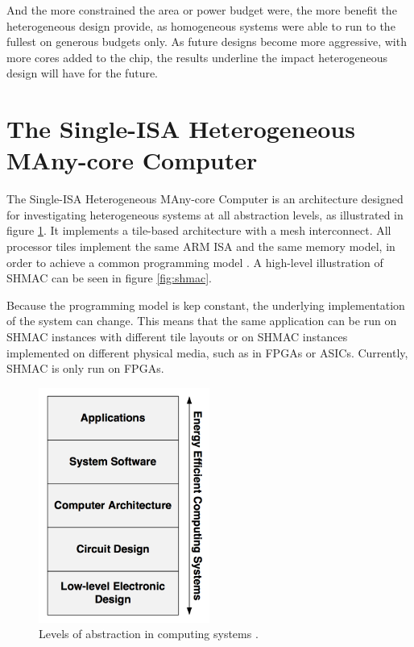 And the more constrained the area or power budget were, the more benefit the heterogeneous design provide, as homogeneous systems were able to run to the fullest on generous budgets only.
As future designs become more aggressive, with more cores added to the chip, the results underline the impact heterogeneous design will have for the future. 


\section{The Single-ISA Heterogeneous MAny-core Computer}
\label{sec:shmac}

The Single-ISA Heterogeneous MAny-core Computer is an architecture designed for investigating heterogeneous
systems at all abstraction levels, as illustrated in figure \ref{fig:shmacAbstractionLevels}.
It implements a tile-based architecture with a mesh interconnect. All processor tiles implement the same
ARM ISA and the same memory model, in order to achieve a common programming model \cite{shmac-plan}.
A high-level illustration of SHMAC can be seen in figure \ref{fig:shmac}.

Because the programming model is kep constant, the underlying implementation of the system can change.
This means that the same application can be run on SHMAC instances with different tile layouts or on
SHMAC instances implemented on different physical media, such as in FPGAs or ASICs. Currently, SHMAC
is only run on FPGAs.

\begin{figure}[htb]
    \centering
    \includegraphics[width=0.5\textwidth]{Figures/Heterogeneous/SHMACAbstractionLevels}
    \caption{Levels of abstraction in computing systems \cite{shmac-plan}.}
    \label{fig:shmacAbstractionLevels}
\end{figure}


